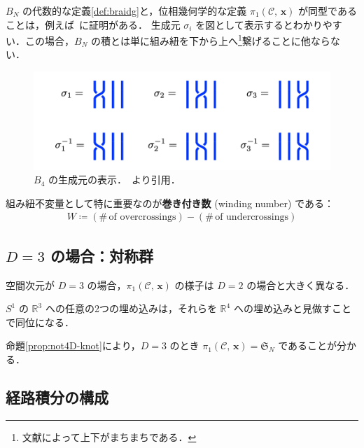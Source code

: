 \documentclass[TQFT_main]{subfiles}
\begin{document}
$B_N$ の代数的な定義\ref{def:braidg}と，位相幾何学的な定義 $\pi_1 (\mathcal{C},\, \bm{x})$ が同型であることは，例えば~\cite{Fadell1961braid}に証明がある．
生成元 $\sigma_i$ を図として表示するとわかりやすい．この場合，$B_N$ の積とは単に組み紐を下から上へ\footnote{文献によって上下がまちまちである．}繋げることに他ならない．
\begin{figure}[H]
    \centering
    \includegraphics[scale=0.75]{./figs/braidg_generator.png}
    \caption{$B_4$ の生成元の表示．~\cite[p.29, Fig. 3.4]{Simon2021}より引用．}
    \label{fig:1-braidg-generator}
\end{figure}%

組み紐不変量として特に重要なのが\textbf{巻き付き数} (winding number) である：
\begin{align}
    W \coloneqq (\#\, \text{of overcrossings}) - (\#\, \text{of undercrossings})
\end{align}

\subsection{$D = 3$ の場合：対称群}

空間次元が $D = 3$ の場合，$\pi_1 (\mathcal{C},\, \bm{x})$ の様子は $D=2$ の場合と大きく異なる．

\begin{myprop}[label=prop:not4D-knot]{}
    $S^1$ の $\mathbb{R}^3$ への任意の2つの埋め込みは，それらを $\mathbb{R}^4$ への埋め込みと見做すことで同位になる．
\end{myprop}

命題\ref{prop:not4D-knot}により，$D=3$ のとき $\pi_1 (\mathcal{C},\, \bm{x}) = \mathfrak{S}_N$ であることが分かる． 

\subsection{経路積分の構成}
\end{document}
